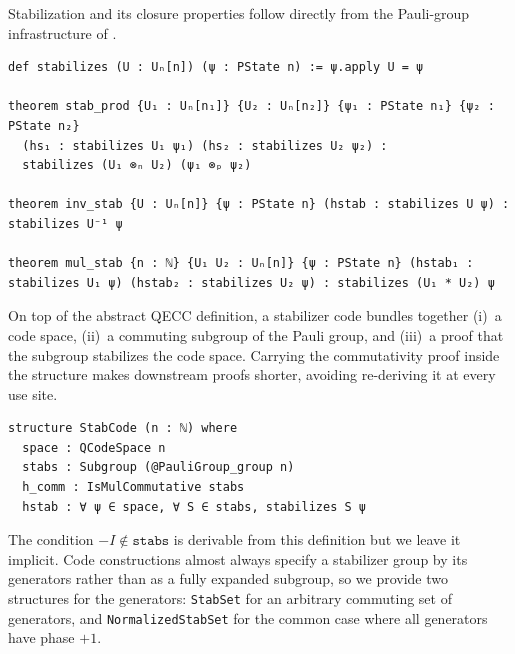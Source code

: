 %

Stabilization and its closure properties follow directly from the Pauli-group
infrastructure of .

\begin{lstlisting}
def stabilizes (U : Uₙ[n]) (ψ : PState n) := ψ.apply U = ψ

theorem stab_prod {U₁ : Uₙ[n₁]} {U₂ : Uₙ[n₂]} {ψ₁ : PState n₁} {ψ₂ : PState n₂}
  (hs₁ : stabilizes U₁ ψ₁) (hs₂ : stabilizes U₂ ψ₂) :
  stabilizes (U₁ ⊗ₙ U₂) (ψ₁ ⊗ₚ ψ₂)

theorem inv_stab {U : Uₙ[n]} {ψ : PState n} (hstab : stabilizes U ψ) : stabilizes U⁻¹ ψ

theorem mul_stab {n : ℕ} {U₁ U₂ : Uₙ[n]} {ψ : PState n} (hstab₁ : stabilizes U₁ ψ) (hstab₂ : stabilizes U₂ ψ) : stabilizes (U₁ * U₂) ψ
\end{lstlisting}

%

On top of the abstract QECC definition, a stabilizer code bundles together (i)~a
code space, (ii)~a commuting subgroup of the Pauli group, and (iii)~a proof that
the subgroup stabilizes the code space. Carrying the commutativity proof inside
the structure makes downstream proofs shorter, avoiding re-deriving it at every use site.

\begin{lstlisting}
structure StabCode (n : ℕ) where
  space : QCodeSpace n
  stabs : Subgroup (@PauliGroup_group n)
  h_comm : IsMulCommutative stabs
  hstab : ∀ ψ ∈ space, ∀ S ∈ stabs, stabilizes S ψ
\end{lstlisting}

%

The condition $-I \notin \mathtt{stabs}$ is derivable from this definition but
we leave it implicit. Code constructions almost always specify a stabilizer
group by its generators rather than as a fully expanded subgroup, so we provide
two structures for the generators: \lstinline{StabSet} for an arbitrary
commuting set of generators, and \lstinline{NormalizedStabSet} for the common
case where all generators have phase $+1$.

